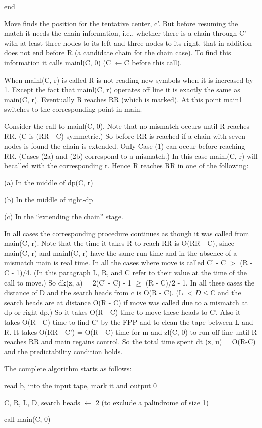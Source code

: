 \documentclass[11pt,a4paper]{report}
\begin{document}
end

Move finds the position for the tentative center, c’. But before resuming the match
it needs the chain information, i.e., whether there is a chain through C’ with at least three
nodes to its left and three nodes to its right, that in addition does not end before R
(a candidate chain for the chain case). To find this information it calls mainl(C, 0) (C $\leftarrow$C
before this call).

When mainl(C, r) is called R is not reading new symbols when it is increased by 1.
Except the fact that mainl(C, r) operates off line it is exactly the same as main(C, r).
Eventually R reaches RR (which is marked). At this point main1 switches to the corresponding point in main. 

Consider the call to mainl(C, 0). Note that no mismatch occurs until R reaches RR.
(C is (RR - C)-symmetric.) So before RR is reached if a chain with seven nodes is found
the chain is extended. Only Case (1) can occur before reaching RR. (Cases (2a) and (2b)
correspond to a mismatch.) In this case mainl(C, r) will becalled with the corresponding r.
Hence R reaches RR in one of the following:

(a) In the middle of dp(C, r)

(b) In the middle of right-dp

(c) In the “extending the chain” stage.

In all cases the corresponding procedure continues as though it was called from
main(C, r). Note that the time it takes R to reach RR is O(RR - C), since main(C, r)
and mainl(C, r) have the same run time and in the absence of a mismatch main is real time.
In all the cases where move is called C’ - C $>$ (R - C - 1)/4. (In this paragraph L,
R, and C refer to their value at the time of the call to move.) So dk(z, a) = 2(C’ - C) -
1 $\geq$ (R - C)/2 - 1. In all these cases the distance of D and the search heads from c is
O(R - C). (L $< D \leq $C and the search heads are at distance O(R - C) if move was
called due to a mismatch at dp or right-dp.) So it takes O(R - C) time to move these
heads to C’. Also it takes O(R - C) time to find C’ by the FPP and to clean the tape
between L and R. It takes O(RR - C’) = O(R - C) time for m and zl(C, 0) to run off line
until R reaches RR and main regains control. So the total time spent dt (z, u) = O(R-C)
and the predictability condition holds.

The complete algorithm starts as follows:
\begin{myindentpar}{2em}

read b, into the input tape, mark it and output 0

C, R, L, D, search heads $\leftarrow$ 2 (to exclude a palindrome of size 1)

call main(C, 0)
\end{myindentpar}
\end{document}
